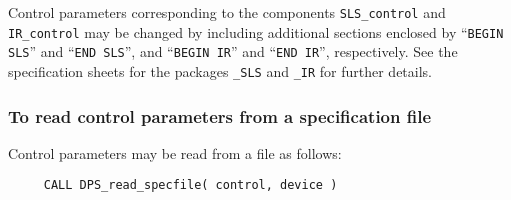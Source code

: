 \documentclass{galahad}
\begin{document}
Control parameters corresponding to the components
{\tt SLS\_control}
and
{\tt IR\_control} may be changed by including additional sections enclosed by
``{\tt BEGIN SLS}'' and
``{\tt END SLS}'', and
``{\tt BEGIN IR}'' and
``{\tt END IR}'', respectively.
See the specification sheets for the packages
{\tt \libraryname\_SLS}
and
{\tt \libraryname\_IR}
for further details.

\subsubsection{To read control parameters from a specification file}
\label{readspec}

Control parameters may be read from a file as follows:
\hskip0.5in
\def\baselinestretch{0.8} {\tt \begin{verbatim}
     CALL DPS_read_specfile( control, device )
\end{verbatim}}
\def\baselinestretch{1.0}
\end{document}
